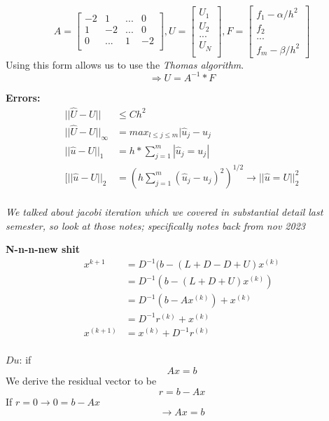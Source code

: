 \documentclass[10pt]{article}
\begin{document}
\[ A =
    \begin{bmatrix}
        -2 & 1 & ... & 0\\
        1 & -2 & ... & 0\\
        0 & ... & 1 & -2\\
    \end{bmatrix}
    ,U = 
    \begin{bmatrix}
        U_1\\
        U_2\\
        ...\\
        U_N\\
    \end{bmatrix}
    ,F =
    \begin{bmatrix}
        f_1 - \alpha / h^2\\
        f_2 \\
        ...\\
        f_m - \beta/h^2
    \end{bmatrix}
\]
Using this form allows us to use the \textit{Thomas algorithm}.\\
\[\Rightarrow U = A^{-1} * F\]

\textbf{Errors:}
\begin{align*}
    ||\hat{U} - U|| &\leq Ch^2\\
    ||\hat{U} - U||_\infty &= max_{l \leq j \leq m} |\hat{u}_j - u_j\\
    ||\hat{u} - U||_1 &= h * \sum_{j=1}^m |\hat{u}_j = u_j|\\
    [||\hat{u} - U||_2 &= (h \sum_{j=1}^m (\hat{u}_j - u_j)^2)^{1/2} \rightarrow ||\hat{u} = U||_2^2\\
\end{align*}

\textit{We talked about jacobi iteration which we covered in substantial detail last semester, so look at those notes; specifically notes back from nov 2023}

\textbf{N-n-n-new shit}\\
\begin{align*}
x^{k+1} &= D^{-1}(b - (L + D - D + U)x^{(k)}\\
        &= D^{-1}(b - (L+D+U)x^{(k)})\\
        &= D^{-1}(b - Ax^{(k)}) + x^{(k)}\\
        &= D^{-1}r^{(k)} + x^{(k)}\\
x^{(k+1)} &= x^{(k)} + D^{-1} r^{(k)}\\
\end{align*}

$Du$: if 
\[Ax = b\]
We derive the residual vector to be
\[r = b - Ax\]
If $r = 0 \rightarrow 0 = b - Ax$
\[\rightarrow Ax = b\]
\end{document}
